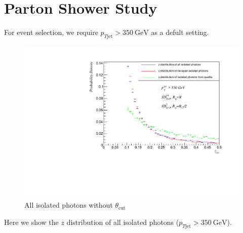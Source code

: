 \documentclass[9pt, mathserif]{beamer}
\begin{document}
    \section{Parton Shower Study}
        \begin{frame}
            For event selection, we require $p_{T\mathrm{jet}}>350\mathrm{~GeV}$ as a defult setting.
            \begin{figure}[t]
                \centering
                \includegraphics[width=0.6\linewidth]{1.pdf}
                \caption{All isolated photons without $\theta_{\mathrm{cut}}$}
            \end{figure}
            Here we show the $z$ distribution of all isolated photons ($p_{T\mathrm{jet}}>350\mathrm{~GeV}$).
        \end{frame}
\end{document}
